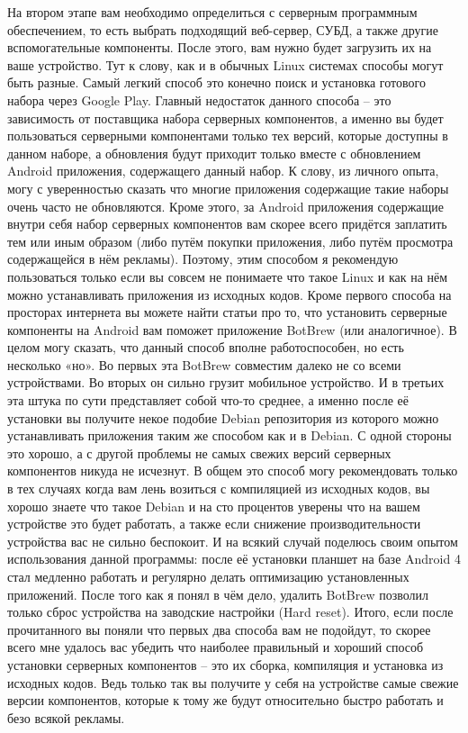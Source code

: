\documentclass[10pt, a5paper]{article}
\begin{document}
На втором этапе вам необходимо определиться с серверным программным обеспечением, то есть выбрать подходящий веб-сервер, СУБД, а также другие вспомогательные компоненты. После этого, вам нужно будет загрузить их на ваше устройство. Тут к слову, как и в обычных Linux системах  способы могут быть разные. Самый легкий способ это конечно поиск и установка готового набора через Google Play. Главный недостаток данного способа – это зависимость от поставщика набора серверных компонентов, а именно вы будет пользоваться серверными компонентами только тех версий, которые доступны  в данном наборе, а обновления будут приходит только вместе с обновлением Android приложения, содержащего данный набор. К слову, из личного опыта, могу с уверенностью сказать что многие приложения содержащие такие наборы очень часто не обновляются. Кроме этого, за Android приложения содержащие внутри себя набор серверных компонентов вам скорее всего придётся заплатить тем или иным образом (либо путём покупки приложения, либо путём просмотра содержащейся в нём рекламы). Поэтому, этим способом я рекомендую пользоваться только если вы совсем не понимаете что такое Linux и как на нём можно устанавливать приложения из исходных кодов. Кроме первого способа на просторах интернета вы можете найти статьи про то, что установить серверные компоненты на Android вам поможет приложение BotBrew (или аналогичное). В целом могу сказать, что данный способ вполне работоспособен, но есть несколько «но». Во первых эта  BotBrew совместим далеко не со всеми устройствами. Во вторых он сильно грузит мобильное устройство. И в третьих эта штука по сути представляет собой что-то среднее, а именно после её установки вы получите некое подобие Debian репозитория из которого можно устанавливать приложения  таким же способом как и в Debian. С одной стороны это хорошо, а с другой проблемы не самых свежих версий серверных компонентов никуда не исчезнут. В общем это способ могу рекомендовать только в тех случаях когда вам лень возиться с компиляцией из исходных кодов, вы хорошо знаете что такое Debian и на сто процентов уверены что на вашем устройстве это будет работать,  а также если снижение производительности устройства вас не сильно беспокоит. И на всякий случай поделюсь своим опытом использования данной программы: после её установки планшет на базе Android 4 стал медленно работать и регулярно делать оптимизацию установленных приложений. После того как я понял в чём дело, удалить BotBrew позволил только сброс устройства на заводские настройки (Hard reset). Итого, если после прочитанного вы поняли что первых два способа вам не подойдут, то скорее всего мне удалось вас убедить что наиболее правильный и хороший способ установки серверных компонентов – это их сборка, компиляция и установка из исходных кодов. Ведь только так вы получите у себя на устройстве самые свежие версии  компонентов, которые к тому же будут относительно быстро работать и безо всякой рекламы.
\end{document}

